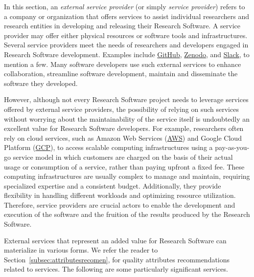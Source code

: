 In this section, an \textit{external service provider} (or simply \textit{service provider}) refers to a company or organization that offers services to assist individual researchers and research entities in developing and releasing their Research Software. A service provider may offer either physical resources or software tools and infrastructures. Several service providers meet the needs of researchers and developers engaged in Research Software development. Examples include \href{https://github.com}{GitHub}, \href{https://zenodo.org/}{Zenodo}, and \href{https://slack.com}{Slack}, to mention a few. Many software developers use such external services to enhance collaboration, streamline software development, maintain and disseminate the software they developed. 

However, although not every Research Software project needs to leverage services offered by external service providers, the possibility of relying on such services without worrying about the maintainability of the service itself is undoubtedly an excellent value for Research Software developers. For example, researchers often rely on cloud services, such as Amazon Web Services (\href{https://aws.amazon.com/}{AWS}) and Google Cloud Platform (\href{https://cloud.google.com/}{GCP}), to access scalable computing infrastructures using a pay-as-you-go service model in which customers are charged on the basis of their actual usage or consumption of a service, rather than paying upfront a fixed fee. These computing infrastructures are usually complex to manage and maintain, requiring specialized expertise and a consistent budget. Additionally, they provide flexibility in handling different workloads and optimizing resource utilization. Therefore, service providers are crucial actors to enable the development and execution of the software and the fruition of the results produced by the Research Software.

External services that represent an added value for Research Software can materialize in various forms. We refer the reader to Section~\ref{subsec:attributesrecomen}, for quality attributes recommendations related to services. The following are some particularly significant services.

